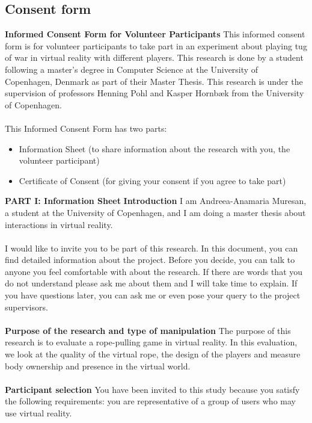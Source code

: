 \subsection{Consent form}
\label{subsection:consentForm}
\textbf{Informed Consent Form for Volunteer Participants}
This informed consent form is for volunteer participants to take part in an experiment about playing tug of war in virtual reality with different players. This research is done by a student following a master’s degree in Computer Science at the University of Copenhagen, Denmark as part of their Master Thesis. This research is under the supervision of professors Henning Pohl and Kasper Hornbæk from the University of Copenhagen.\\
\\
This Informed Consent Form has two parts:
\begin{itemize}
    \item  Information Sheet (to share information about the research with you, the volunteer participant)
    \item  Certificate of Consent (for giving your consent if you agree to take part)
\end{itemize}
\textbf{PART I: Information Sheet}
\textbf{Introduction}
I am Andreea-Anamaria Muresan, a student at the University of Copenhagen, and I am doing a master thesis about interactions in virtual reality.\\
\\
I would like to invite you to be part of this research. In this document, you can find detailed information about the project. Before you decide, you can talk to anyone you feel comfortable with about the research. If there are words that you do not understand please ask me about them and I will take time to explain. If you have questions later, you can ask me or even pose your query to the project supervisors.\\
\\
\textbf{Purpose of the research and type of manipulation}
The purpose of this research is to evaluate a rope-pulling game in virtual reality. In this evaluation, we look at the quality of the virtual rope, the design of the players and measure body ownership and presence in the virtual world.\\
\\
\textbf{Participant selection}
You have been invited to this study because you satisfy the following requirements: you are representative of a group of users who may use virtual reality.\\

